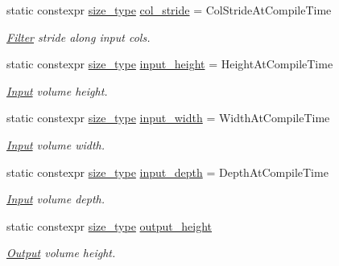\begin{DoxyCompactItemize}
static constexpr \hyperlink{namespaceffnn_a63b90a2fd70eb76684eac482a51633e5}{size\-\_\-type} \hyperlink{structffnn_1_1layer_1_1convolution_1_1options_a9f5dc60cb9493d65119fa087c63c0c93}{col\-\_\-stride} = Col\-Stride\-At\-Compile\-Time
\begin{DoxyCompactList}\small\item\em \hyperlink{classffnn_1_1layer_1_1convolution_1_1_filter}{Filter} stride along input cols. \end{DoxyCompactList}\item 
static constexpr \hyperlink{namespaceffnn_a63b90a2fd70eb76684eac482a51633e5}{size\-\_\-type} \hyperlink{structffnn_1_1layer_1_1convolution_1_1options_aabb3c99df1150983902ebf9741a22a1a}{input\-\_\-height} = Height\-At\-Compile\-Time
\begin{DoxyCompactList}\small\item\em \hyperlink{classffnn_1_1layer_1_1_input}{Input} volume height. \end{DoxyCompactList}\item 
static constexpr \hyperlink{namespaceffnn_a63b90a2fd70eb76684eac482a51633e5}{size\-\_\-type} \hyperlink{structffnn_1_1layer_1_1convolution_1_1options_a17abc9ea9d41cf399fbeae5e3f7580f4}{input\-\_\-width} = Width\-At\-Compile\-Time
\begin{DoxyCompactList}\small\item\em \hyperlink{classffnn_1_1layer_1_1_input}{Input} volume width. \end{DoxyCompactList}\item 
static constexpr \hyperlink{namespaceffnn_a63b90a2fd70eb76684eac482a51633e5}{size\-\_\-type} \hyperlink{structffnn_1_1layer_1_1convolution_1_1options_a5c928d8733be98927ccd22d009739deb}{input\-\_\-depth} = Depth\-At\-Compile\-Time
\begin{DoxyCompactList}\small\item\em \hyperlink{classffnn_1_1layer_1_1_input}{Input} volume depth. \end{DoxyCompactList}\item 
static constexpr \hyperlink{namespaceffnn_a63b90a2fd70eb76684eac482a51633e5}{size\-\_\-type} \hyperlink{structffnn_1_1layer_1_1convolution_1_1options_a87fc0d1d3147a21912001842783a0d54}{output\-\_\-height}
\begin{DoxyCompactList}\small\item\em \hyperlink{classffnn_1_1layer_1_1_output}{Output} volume height. \end{DoxyCompactList}\item 

\end{DoxyCompactItemize}
